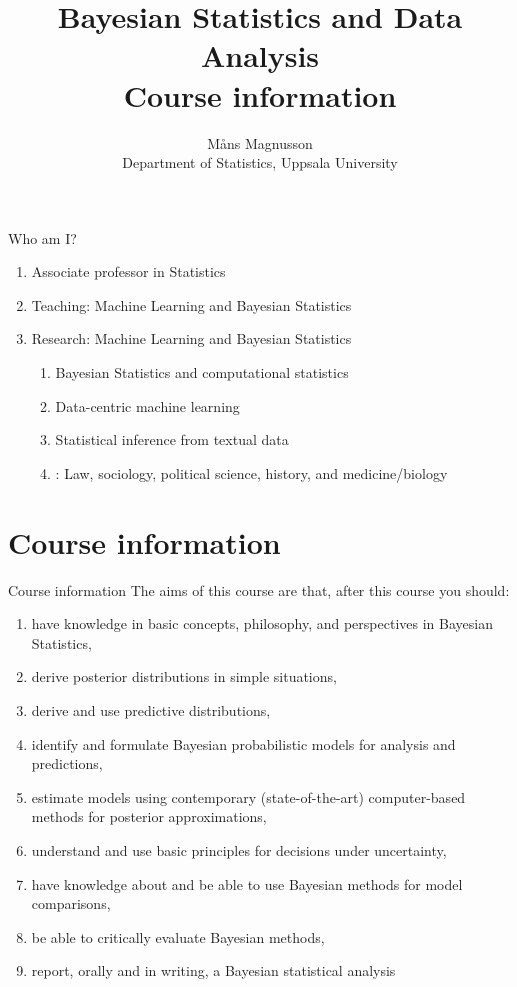 \documentclass[10pt]{beamer}
\title[]{{\color{black}Bayesian Statistics and Data Analysis \\ Course information}}
\author[]{M{\aa}ns Magnusson \\ Department of Statistics, Uppsala University}
\date{}
\begin{document}
\frame{\titlepage
}





\begin{frame}{Who am I?}

\begin{enumerate}
\item Associate professor in Statistics
\item Teaching: Machine Learning and Bayesian Statistics
\item Research: Machine Learning and Bayesian Statistics
\begin{enumerate}
\item Bayesian Statistics and computational statistics
\pause
\item Data-centric machine learning
\pause
\item Statistical inference from textual data
\pause
\item {}: Law, sociology, political science, history, and medicine/biology
\end{enumerate}
\end{enumerate}

\end{frame}


\section{Course information}
\frame{\sectionpage}

\begin{frame}{Course information}
The aims of this course are that, after this course you should:\\[3mm]\pause
\begin{enumerate}
\item have knowledge in basic concepts, philosophy, and perspectives in Bayesian Statistics,\pause
\item derive posterior distributions in simple situations,\pause
\item derive and use predictive distributions,\pause
\item identify and formulate Bayesian probabilistic models for analysis and predictions,\pause
\item estimate models using contemporary (state-of-the-art) computer-based methods for posterior approximations, \pause
\item understand and use basic principles for decisions under uncertainty, \pause
\item have knowledge about and be able to use Bayesian methods for model comparisons,\pause
\item be able to critically evaluate Bayesian methods,\pause
\item report, orally and in writing, a Bayesian statistical analysis\pause
\end{enumerate}

\end{frame}
\end{document}
